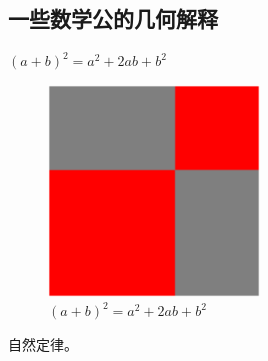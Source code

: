 \documentclass[main.tex]{subfiles}
\begin{document}
\subsection{一些数学公的几何解释}
$(a+b)^2 = a^2 + 2ab + b^2$


\begin{figure}[h]
    \centering
    \includegraphics[width=0.5\textwidth]{images/ps.1.1.eps}
    \caption{$(a+b)^2 = a^2 + 2ab + b^2$}
    \label{fig:III.1.1}
\end{figure}

\begin{example}[“我们” vs “球上的人”]
自然定律。
\end{example}
\end{document}
